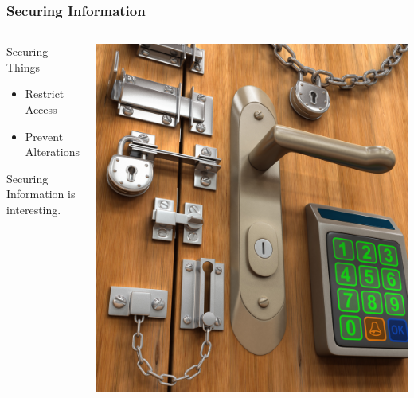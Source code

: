 \documentclass[aspectratio=169]{beamer}              %
\begin{document}
\begin{frame}
\frametitle{Securing Information}

\begin{columns}
	\begin{column}{0.5\textwidth}

		Securing Things

		\begin{itemize}
			\item Restrict Access
			\item Prevent Alterations
		\end{itemize}

		Securing Information is interesting.
	
	\end{column}

	\begin{column}{0.5\textwidth}

		\includegraphics[width = \textwidth]{best-door-locks.jpeg}

	\end{column}

\end{columns}

\end{frame}
\end{document}
